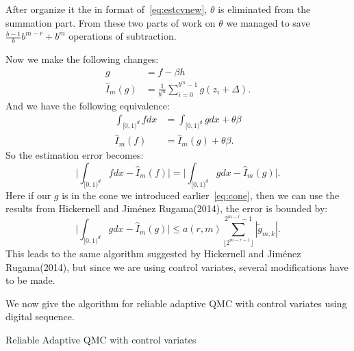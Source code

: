 After organize it the in format of~\eqref{eq:estcvnew}, $\theta$ is eliminated from the summation part. From these two parts of work on $\theta$ we managed to save $\frac{b-1}{b}b^{m-r}+b^m$ operations of subtraction.



Now we make the following changes:
\begin{align*}
    g&=f-\beta h\\ 
    \hat{I}_m({g})&= \frac{1}{b^m}\sum_{i=0}^{b^m-1}g(z_i+\Delta).
\end{align*}
And we have the following equivalence:
\begin{align*}
    \int_{[0,1)^d}fdx &= \int_{[0,1)^d}gdx +\theta\beta\\ 
    \hat{I}_m(f) &= \hat{I}_m(g)+\theta\beta.
\end{align*}
So the estimation error becomes:
\[
\Big| \int_{[0,1)^d}fdx- \hat{I}_m(f) \Big|
    =\Big| \int_{[0,1)^d}gdx- \hat{I}_m(g) \Big|.
\]
Here if our $g$ is in the cone we introduced earlier~\eqref{eq:cone}, then we can use the results from Hickernell and Jiménez Rugama(2014)\cite{hickernell2014reliable}, the error is bounded by:
\[
\Big|\int_{[0,1)^d}gdx - \hat{I}_m(g)\Big| \leq a(r,m) \sum_{\lfloor 2^{m-r-1} \rfloor}^{2^{m-r}-1} |\tilde{g}_{m,k}|.
\]
This leads to the same algorithm suggested by Hickernell and Jiménez Rugama(2014)\cite{hickernell2014reliable}, but since we are using control variates, several modifications have to be made.


We now give the algorithm for reliable adaptive QMC with control variates 
using digital sequence.
\begin{algorithm}[h]
\DontPrintSemicolon
\KwData{function $f$ and $\boldsymbol{H}$; 
    value of $\int_{[0,1)^d}h_jdx=\theta_j$; tolerance $\varepsilon$} 
\caption{Reliable Adaptive QMC with control variates}\label{alg:qmccv}
\end{algorithm}

